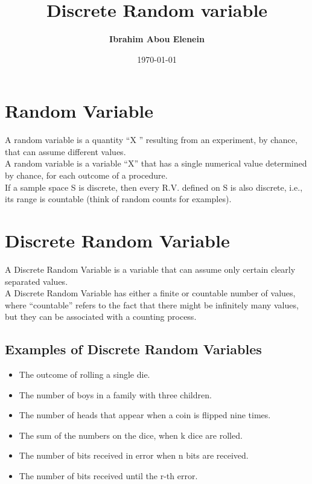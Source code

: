 \documentclass[12pt]{article}
\title{\textbf{Discrete Random variable}} %
\author{\textbf{Ibrahim Abou Elenein}}
\date{\today} %
\theoremstyle{definition}
\begin{document}
\setlength{\droptitle}{-5em}    
\maketitle
\tableofcontents
\pagebreak

\section{Random Variable}
A random variable is a quantity “X ” resulting from an experiment, by chance,
that can assume different values.\\

A random variable is a variable “X” that
has a single numerical value determined by chance, for each outcome of a
procedure.\\

If a sample space S is discrete, then every R.V.  defined on S is
also discrete, i.e., its range is countable (think of random counts for
examples).
\section{Discrete Random Variable}
A Discrete Random Variable is a variable that can assume only certain clearly
separated values. \\

A Discrete Random Variable has either a finite or countable
number of values, where “countable” refers to the fact that there might be
infinitely many values, but they can be associated with a counting process.
\subsection{Examples of Discrete Random Variables}
\begin{itemize}
    \item The outcome of rolling a single die.
    \item The number of boys in a family with three children.
    \item The number of heads that appear when a coin is flipped nine times.
    \item The sum of the numbers on the dice, when k dice are rolled.
    \item The number of bits received in error when n bits are received.
    \item The number of bits received until the r-th error.
\end{itemize}
\end{document}
